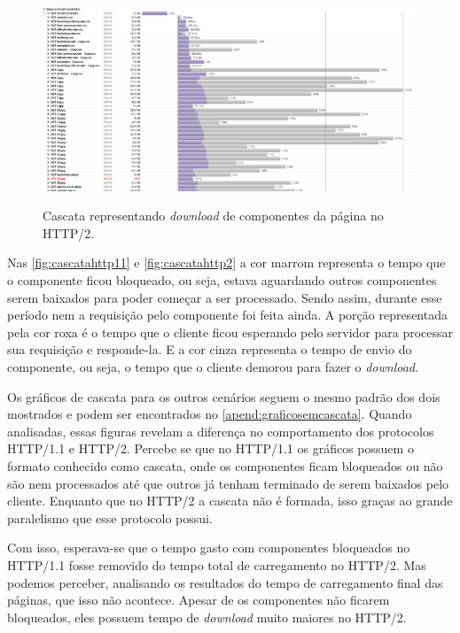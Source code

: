 \begin{figure}[!htb]
    \centering
    \caption{Cascata representando \textit{download} de componentes da página no HTTP/2.}
    \includegraphics[width=1.0\textwidth]{./04-figuras/analise-de-resultados/cascata_http2}
    \label{fig:cascatahttp2}
\end{figure}

Nas \autoref{fig:cascatahttp11} e \autoref{fig:cascatahttp2} a cor marrom representa o tempo que o componente ficou bloqueado, ou seja, estava aguardando outros componentes serem baixados para poder começar a ser processado. Sendo assim, durante esse período nem a requisição pelo componente foi feita ainda. A porção representada pela cor roxa é o tempo que o cliente ficou esperando pelo servidor para processar sua requisição e responde-la. E a cor cinza representa o tempo de envio do componente, ou seja, o tempo que o cliente demorou para fazer o \textit{download}.

Os gráficos de cascata para os outros cenários seguem o mesmo padrão dos dois mostrados e podem ser encontrados no \autoref{apend:graficosemcascata}. Quando analisadas, essas figuras revelam a diferença no comportamento dos protocolos HTTP/1.1 e HTTP/2. Percebe se que no HTTP/1.1 os gráficos possuem o formato conhecido como cascata, onde os componentes ficam bloqueados ou não são nem processados até que outros já tenham terminado de serem baixados pelo cliente. Enquanto que no HTTP/2 a cascata não é formada, isso graças ao grande paralelismo que esse protocolo possui.

Com isso, esperava-se que o tempo gasto com componentes bloqueados no HTTP/1.1 fosse removido do tempo total de carregamento no HTTP/2. Mas podemos perceber, analisando os resultados do tempo de carregamento final das páginas, que isso não acontece. Apesar de os componentes não ficarem bloqueados, eles possuem tempo de \textit{download} muito maiores no HTTP/2.

